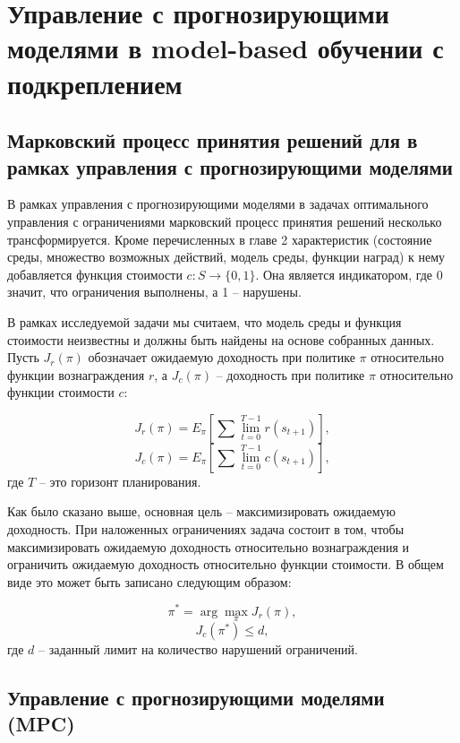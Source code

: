 \chapter{Управление с прогнозирующими моделями в model-based обучении с подкреплением}\label{chap4}

\section{Марковский процесс принятия решений для в рамках управления с прогнозирующими моделями}\label{1sec:optimal-control}


В рамках управления с прогнозирующими моделями в задачах оптимального управления с ограничениями марковский процесс принятия решений несколько трансформируется. Кроме перечисленных в главе 2 характеристик (состояние среды, множество возможных действий, модель среды, функции наград) к нему добавляется функция стоимости $c: S \to \{0, 1\}$. Она является индикатором, где 0 значит, что ограничения выполнены, а 1 -- нарушены. 

В рамках исследуемой задачи мы считаем, что модель среды и функция стоимости неизвестны и должны быть найдены на основе собранных данных. Пусть $J_r (\pi)$ обозначает ожидаемую доходность при политике $\pi$ относительно функции вознаграждения $r$, а $J_c (\pi)$ -- доходность при политике $\pi$ относительно функции стоимости $c$:

$$J_r(\pi) = E_{\pi}[\sum\lim_{t=0}^{T-1} r(s_{t+1})],$$
$$J_c(\pi) = E_{\pi}[\sum\lim_{t=0}^{T-1} c(s_{t+1})],$$
где $T$ -- это горизонт планирования. 

Как было сказано выше, основная цель -- максимизировать ожидаемую доходность. При наложенных ограничениях задача состоит в том, чтобы максимизировать ожидаемую доходность  относительно вознаграждения и ограничить ожидаемую доходность относительно функции стоимости. В общем виде это может быть записано следующим образом:

$$\pi^* = \arg \max_{\pi} J_r(\pi),$$
$$J_c(\pi^*) \leq d, $$
где $d$ -- заданный лимит на количество нарушений ограничений. 


\section{Управление с прогнозирующими моделями (MPC)}\label{1sec:optimal-control}


